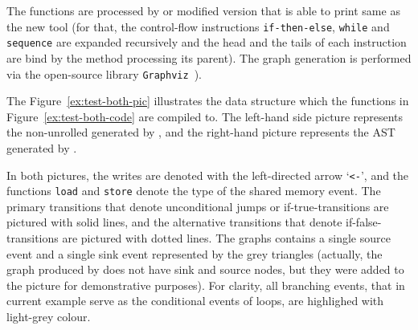 The functions are processed by \porthos[2] or modified version \porthos[1] that is able to print same \xgraph[CF] as the new tool (for that, the control-flow instructions \texttt{if-then-else}, \texttt{while} and \texttt{sequence} are expanded recursively and the head and the tails of each instruction are bind by the method processing its parent).
The graph generation is performed via the open-source library \texttt{Graphviz}~\cite{ellson2001graphviz}).

The Figure~\ref{ex:test-both-pic} illustrates the data structure which the functions in Figure~\ref{ex:test-both-code} are compiled to.
The left-hand side picture represents the non-unrolled \xgraph[CF] generated by \porthos[2], and the right-hand picture represents the AST generated by \porthos[1].

In both pictures, the writes are denoted with the left-directed arrow `\lstinline{<-}', and the functions \lstinline{load} and \lstinline{store} denote the type of the shared memory event.
The primary transitions that denote unconditional jumps or if-true-transitions are pictured with solid lines, and the alternative transitions that denote if-false-transitions are pictured with dotted lines.
The graphs contains a single source event and a single sink event represented by the grey triangles (actually, the graph produced by \porthos[1] does not have sink and source nodes, but they were added to the picture for demonstrative purposes).
For clarity, all branching events, that in current example serve as the conditional events of loops, are highlighed with light-grey colour.


